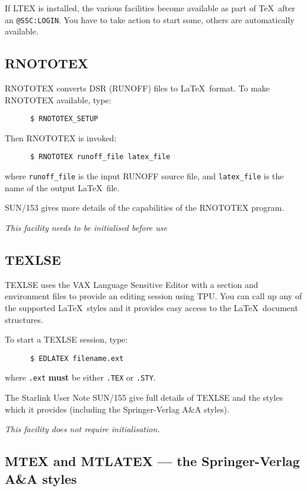 If LTEX is installed, the various facilities become available as part of \TeX\
after an {\tt @SSC:LOGIN}. You have to take action to start some, others are
automatically available.

\subsection{RNOTOTEX}
\label{se:rtt}

RNOTOTEX converts DSR (RUNOFF) files to \LaTeX\ format. To make RNOTOTEX
available, type:

\begin{verbatim}
      $ RNOTOTEX_SETUP
\end{verbatim}

Then RNOTOTEX is invoked:

\begin{verbatim}
      $ RNOTOTEX runoff_file latex_file
\end{verbatim}

where {\tt runoff\_file} is the input RUNOFF source file, and {\tt latex\_file}
is the name of the output \LaTeX\ file.

SUN/153 gives more details of the capabilities of the RNOTOTEX program.

{\em This facility needs to be initialised before use}

\subsection{TEXLSE}
\label{se:tlse}

TEXLSE uses the VAX Language Sensitive Editor with a section and environment
files to provide an editing session using TPU. You can call up any of the
supported \LaTeX\ styles and it provides easy access to the \LaTeX\ document
structures.

To start a TEXLSE session, type:

\begin{verbatim}
      $ EDLATEX filename.ext
\end{verbatim}

where \verb+.ext+ {\bf must} be either {\tt .TEX} or {\tt .STY}.

The Starlink User Note SUN/155 give full details of TEXLSE and the styles which
it provides (including the Springer-Verlag A\&A styles).

{\em This facility does not require initialisation.}

\subsection{MTEX and MTLATEX --- the Springer-Verlag A\&A styles}
\label{se:mt}

